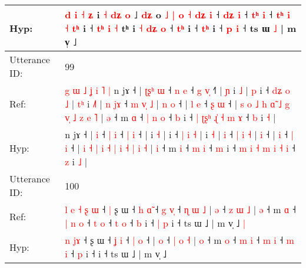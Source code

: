 \documentclass[10pt]{article}
\DeclareRobustCommand{\hl}[1]{{\textcolor{red}{#1}}}
\begin{document}
\begin{longtable}{ll}
 \\
Hyp: & \hl{d} \hl{i} \hl{˧} \hl{ʑ} i \hl{˧} \hl{}\hl{d}\hl{ʑ} \hl{o} ˩\hl{} \hl{}\hl{d}\hl{ʑ} o \hl{˩} \hl{|} \hl{}\hl{o} \hl{˧} \hl{}\hl{d}\hl{ʑ} \hl{i} ˧ \hl{d}\hl{ʑ} \hl{}\hl{i} ˧ \hl{t}\hl{ʰ} \hl{i} ˧ \hl{t}\hl{ʰ} \hl{i} \hl{˧} \hl{}\hl{t}\hl{ʰ} i ˧ \hl{}\hl{}\hl{t}\hl{ʰ} \hl{i} \hl{˧} tʰ i \hl{˧}\hl{ }\hl{d}\hl{ʑ} \hl{o} ˧ \hl{t}\hl{ʰ} i ˧ \hl{}\hl{t}\hl{ʰ} i ˧ \hl{p} \hl{i} ˧ ts ɯ \hl{}\hl{˩} | m v̩ ˩
 \\
\midrule
Utterance ID: & 99 \\
Ref: & \hl{g}\hl{ }\hl{ɯ}\hl{ }\hl{˩}\hl{ }\hl{ʝ}\hl{ }\hl{i}\hl{ }\hl{˥}\hl{ }\hl{|}\hl{ }n jɤ ˧ |\hl{ }\hl{ʈ}\hl{ʂ}\hl{ʰ} \hl{ɯ} ˧ \hl{n} \hl{e} ˧ \hl{g} \hl{v}\hl{̩} ˧\hl{˥} |\hl{ }\hl{ɲ} i \hl{˩} |\hl{ }\hl{p} i ˧ \hl{d}\hl{ʑ} \hl{o} \hl{˩} |\hl{ }\hl{t}\hl{ʰ} i \hl{˩}\hl{˥} |\hl{ }\hl{n} \hl{j}\hl{ɤ} ˧ \hl{m} \hl{v}\hl{̩} \hl{˩} |\hl{ }\hl{n} \hl{o} ˧ |\hl{ }\hl{l} \hl{e} ˧ \hl{ʂ} \hl{ɯ} ˧ |\hl{ }\hl{s} \hl{o} \hl{˩} \hl{h} \hl{ɑ}\hl{̃} \hl{˩} \hl{g} \hl{v}\hl{̩} \hl{˩} \hl{z} \hl{e} \hl{˥} | \hl{ə} ˧ m \hl{ɑ} ˧\hl{ }\hl{|} \hl{n} \hl{o} ˧ \hl{b} i ˧ \hl{|} \hl{ʈ}\hl{ʂ}\hl{ʰ} \hl{ɻ}\hl{̍} \hl{˧} \hl{m} \hl{ɤ} ˧ \hl{b} i \hl{˧} |
 \\
Hyp: & \hl{}\hl{}\hl{}\hl{}\hl{}\hl{}\hl{}\hl{}\hl{}\hl{}\hl{}\hl{}\hl{}\hl{}n jɤ ˧ |\hl{}\hl{}\hl{}\hl{} \hl{i} ˧ \hl{|} \hl{i} ˧ \hl{|} \hl{}\hl{i} ˧\hl{} |\hl{}\hl{} i \hl{˧} |\hl{}\hl{} i ˧ \hl{}\hl{|} \hl{i} \hl{˧} |\hl{}\hl{}\hl{} i \hl{}\hl{˧} |\hl{}\hl{} \hl{}\hl{i} ˧ \hl{|} \hl{}\hl{i} \hl{˧} |\hl{}\hl{} \hl{i} ˧ |\hl{}\hl{} \hl{i} ˧ \hl{|} \hl{i} ˧ |\hl{}\hl{} \hl{i} \hl{˧} \hl{|} \hl{}\hl{i} \hl{˧} \hl{|} \hl{}\hl{i} \hl{˧} \hl{|} \hl{i} \hl{˧} | \hl{i} ˧ m \hl{i} ˧\hl{}\hl{} \hl{m} \hl{i} ˧ \hl{m} i ˧ \hl{m} \hl{i}\hl{ }\hl{˧} \hl{}\hl{m} \hl{i} \hl{˧} \hl{i} ˧ \hl{z} i \hl{˩} |
 \\
\midrule
Utterance ID: & 100 \\
Ref: & \hl{l}\hl{ }\hl{e}\hl{ }\hl{˧} \hl{ʂ}\hl{ }\hl{ɯ} ˧\hl{ }\hl{|} ʂ ɯ ˧ \hl{h} \hl{ɑ}\hl{̃} ˧ \hl{g} \hl{v}\hl{̩} ˧\hl{ }\hl{ɳ}\hl{ }\hl{ɯ}\hl{ }\hl{˩} | \hl{ə} ˧ \hl{z} \hl{ɯ} \hl{˩} | \hl{ə} ˧ m \hl{ɑ} ˧\hl{ }\hl{|} \hl{n} \hl{o} ˧ \hl{t} \hl{o} ˧ \hl{t} \hl{o} ˧ \hl{b} i ˧\hl{ }\hl{|}\hl{ }\hl{p} i ˧ ts ɯ ˩ | m v̩ ˩\hl{ }\hl{|}
 \\
Hyp: & \hl{}\hl{}\hl{}\hl{}\hl{n} \hl{}\hl{j}\hl{ɤ} ˧\hl{}\hl{} ʂ ɯ ˧ \hl{ʝ} \hl{}\hl{i} ˧ \hl{|} \hl{}\hl{o} ˧\hl{}\hl{}\hl{}\hl{}\hl{}\hl{} | \hl{o} ˧ \hl{|} \hl{o} \hl{˧} | \hl{o} ˧ m \hl{o} ˧\hl{}\hl{} \hl{m} \hl{i} ˧ \hl{m} \hl{i} ˧ \hl{m} \hl{i} ˧ \hl{p} i ˧\hl{}\hl{}\hl{}\hl{} i ˧ ts ɯ ˩ | m v̩ ˩\hl{}\hl{}

\end{longtable}
\end{document}

